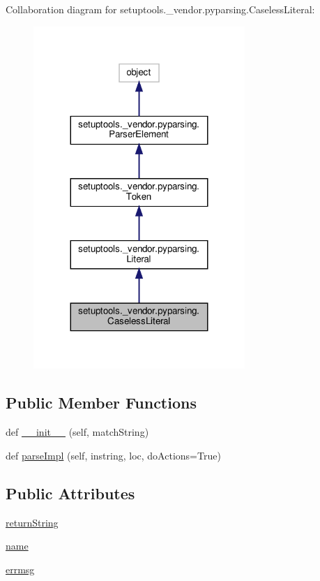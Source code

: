 Collaboration diagram for setuptools.\+\_\+vendor.\+pyparsing.\+Caseless\+Literal\+:
\nopagebreak
\begin{figure}[H]
\begin{center}
\leavevmode
\includegraphics[width=227pt]{classsetuptools_1_1__vendor_1_1pyparsing_1_1CaselessLiteral__coll__graph}
\end{center}
\end{figure}
\subsection*{Public Member Functions}
\begin{DoxyCompactItemize}
\item 
def \hyperlink{classsetuptools_1_1__vendor_1_1pyparsing_1_1CaselessLiteral_addabb133817e090020fa036c6d80b642}{\+\_\+\+\_\+init\+\_\+\+\_\+} (self, match\+String)
\item 
def \hyperlink{classsetuptools_1_1__vendor_1_1pyparsing_1_1CaselessLiteral_a5e1ea0886b7a8b59fd5e178fbea79cc6}{parse\+Impl} (self, instring, loc, do\+Actions=True)
\end{DoxyCompactItemize}
\subsection*{Public Attributes}
\begin{DoxyCompactItemize}
\item 
\hyperlink{classsetuptools_1_1__vendor_1_1pyparsing_1_1CaselessLiteral_a51c2481d99a1d503a473c1c92a12ee9c}{return\+String}
\item 
\hyperlink{classsetuptools_1_1__vendor_1_1pyparsing_1_1CaselessLiteral_a3b03861ddca5913c14881cc79f5de7df}{name}
\item 
\hyperlink{classsetuptools_1_1__vendor_1_1pyparsing_1_1CaselessLiteral_ad9db3830c3b3635f6b6d93552f096756}{errmsg}
\end{DoxyCompactItemize}
